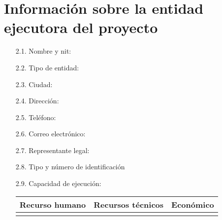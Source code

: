 \section{Información sobre la entidad ejecutora del proyecto}
\begin{itemize}
\item[2.1.] Nombre y nit:
\item[2.2.] Tipo de entidad:

\item[2.3.] Ciudad:
\item[2.4.] Dirección:
\item[2.5.] Teléfono:
\item[2.6.] Correo electrónico:
\item[2.7.] Representante legal:
\item[2.8.] Tipo y número de identificación
\item[2.9.] Capacidad de ejecución: 

\begin{tabular}{|l|l|l|}\hline
    Recurso humano & Recursos técnicos & Económico\\\hline
    & &\\  \hline
\end{tabular}
\end{itemize}



